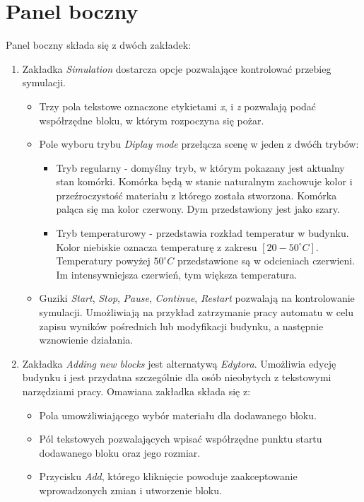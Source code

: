 \section{Panel boczny}
Panel boczny składa się z dwóch zakładek:
\begin {enumerate}
\item Zakładka \textit{Simulation} dostarcza opcje pozwalające kontrolować przebieg symulacji.
\begin {itemize}
	\item Trzy pola tekstowe oznaczone etykietami \textit{x}, i \textit{z} pozwalają podać współrzędne bloku, w którym rozpoczyna się pożar.
	\item Pole wyboru trybu \textit{Diplay mode} przełącza scenę w jeden z dwóćh trybów:
	\begin{itemize}
	\item Tryb regularny - domyślny tryb, w którym pokazany jest aktualny stan komórki. Komórka będą w stanie naturalnym zachowuje kolor i przeźroczystość materiału z którego została stworzona. Komórka paląca się ma kolor czerwony. Dym przedstawiony jest jako szary.
	\item Tryb temperaturowy - przedstawia rozkład temperatur w budynku. Kolor niebiskie oznacza temperaturę z zakresu $[20-50^\circ C]$. Temperatury powyżej $50^\circ C$ przedstawione są w odcieniach czerwieni. Im intensywniejsza czerwień, tym większa temperatura.
\end{itemize}
	\item Guziki \textit {Start}, \textit{Stop}, \textit{Pause}, \textit{Continue}, \textit {Restart} pozwalają na kontrolowanie symulacji. Umożliwiają na przykład zatrzymanie pracy automatu w celu zapisu wyników pośrednich lub modyfikacji budynku, a następnie wznowienie działania.
	\end{itemize}
\item Zakładka \textit{Adding new blocks} jest alternatywą \textit{Edytora}. Umożliwia edycję budynku i jest przydatna szczególnie dla osób nieobytych z tekstowymi narzędziami pracy. Omawiana zakładka składa się z:
\begin {itemize}
\item Pola umowżliwiającego wybór materiału dla dodawanego bloku.
\item Pól tekstowych pozwalających wpisać współrzędne punktu startu dodawanego bloku oraz jego rozmiar.
\item Przycisku \textit{Add}, którego kliknięcie powoduje zaakceptowanie wprowadzonych zmian i utworzenie bloku.
\end {itemize}
\end {enumerate}
 

